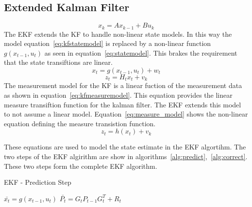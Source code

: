 \documentclass[letter]{IEEEtran}
\begin{document}
\subsection{Extended Kalman Filter}
\begin{equation}
\label{eq:kfstatemodel}
x_k = Ax_{k-1} + Bu_{k}
\end{equation}
The EKF extends the KF to handle non-linear state models. In this way the model equation~\ref{eq:kfstatemodel} is replaced by a non-linear function $g(x_{t-1}, u_t)$ as seen in equation~\ref{eq:statemodel}. This brakes the requirement that the state transiftions are linear.
\begin{equation}
\label{eq:statemodel}
x_t = g(x_{t-1}, u_t) + w_t
\end{equation}
\begin{equation}
\label{eq:kfmeasuremodel}
z_t = H_t x_t + v_k
\end{equation}
The measurement model for the KF is a linear fuction of the measurement data as shown in equation~\ref{eq:kfmeasuremodel}. This equation provides the linear measure transiftion function for the kalman filter. The EKF extends this model to not assume a linear model. Equation~\ref{eq:measure_model} shows the non-linear equation defining the measure transistion function.
\begin{equation}
\label{eq:measure_model}
z_t = h(x_t) + v_k
\end{equation}

These equations are used to model the state estimate in the EKF algortihm. The two steps of the EKF algirithm are show in algorithms~\ref{alg:predict},~\ref{alg:correct}. These two steps form the complete EKF algorithm.
\begin{algorithm}
\caption{EKF - Prediction Step}
\begin{algorithmic}[1]
\STATE $\bar{x_t} = g(x_{t-1}, u_t)$
\STATE $\bar{P_t} = G_t P_{t-1} G_t^T + R_t$
\end{algorithmic}
\label{alg:predict}
\end{algorithm}
\end{document}
